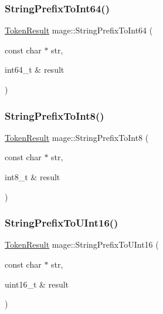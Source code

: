 \hypertarget{namespacemage_a8fda775d2c9f4f0a465d566540e91e82}{}\label{namespacemage_a8fda775d2c9f4f0a465d566540e91e82} 
\subsubsection{\texorpdfstring{String\+Prefix\+To\+Int64()}{StringPrefixToInt64()}}
{\footnotesize\ttfamily \hyperlink{namespacemage_a2178ba2411db5912f41b2e7698c2037d}{Token\+Result} mage\+::\+String\+Prefix\+To\+Int64 (\begin{DoxyParamCaption}\item[{const char $\ast$}]{str,  }\item[{int64\+\_\+t \&}]{result }\end{DoxyParamCaption})}

\hypertarget{namespacemage_ab2a4f965199e2efba23cbbd052a66283}{}\label{namespacemage_ab2a4f965199e2efba23cbbd052a66283} 
\subsubsection{\texorpdfstring{String\+Prefix\+To\+Int8()}{StringPrefixToInt8()}}
{\footnotesize\ttfamily \hyperlink{namespacemage_a2178ba2411db5912f41b2e7698c2037d}{Token\+Result} mage\+::\+String\+Prefix\+To\+Int8 (\begin{DoxyParamCaption}\item[{const char $\ast$}]{str,  }\item[{int8\+\_\+t \&}]{result }\end{DoxyParamCaption})}

\hypertarget{namespacemage_a59f623733dd4ad636de4cea46467da7d}{}\label{namespacemage_a59f623733dd4ad636de4cea46467da7d} 
\subsubsection{\texorpdfstring{String\+Prefix\+To\+U\+Int16()}{StringPrefixToUInt16()}}
{\footnotesize\ttfamily \hyperlink{namespacemage_a2178ba2411db5912f41b2e7698c2037d}{Token\+Result} mage\+::\+String\+Prefix\+To\+U\+Int16 (\begin{DoxyParamCaption}\item[{const char $\ast$}]{str,  }\item[{uint16\+\_\+t \&}]{result }\end{DoxyParamCaption})}

